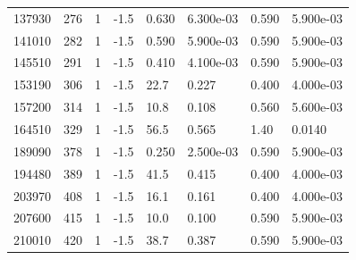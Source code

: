 \documentclass[preview]{standalone}
\begin{document}
{{{{{{{{{\begin{tabular}{L{1.2cm}C{1.2cm} C{0.3cm}C{0.5cm} C{1.4cm}C{1.4cm} C{1.4cm}C{1.4cm}}
  137930  &   276  & 1     & -1.5 &  0.630  & 6.300e-03  & 0.590 &  5.900e-03   \\ 
  141010  &   282  & 1     & -1.5 &  0.590  & 5.900e-03  & 0.590 &  5.900e-03   \\ 
  145510  &   291  & 1     & -1.5 &  0.410  & 4.100e-03  & 0.590 &  5.900e-03   \\ 
  153190  &   306  & 1     & -1.5 &  22.7  & 0.227  & 0.400 &  4.000e-03   \\ 
  157200  &   314  & 1     & -1.5 &  10.8  & 0.108  & 0.560 &  5.600e-03   \\ 
  164510  &   329  & 1     & -1.5 &  56.5  & 0.565  & 1.40 &  0.0140   \\ 
  189090  &   378  & 1     & -1.5 &  0.250  & 2.500e-03  & 0.590 &  5.900e-03   \\ 
  194480  &   389  & 1     & -1.5 &  41.5  & 0.415  & 0.400 &  4.000e-03   \\ 
  203970  &   408  & 1     & -1.5 &  16.1  & 0.161  & 0.400 &  4.000e-03   \\ 
  207600  &   415  & 1     & -1.5 &  10.0  & 0.100  & 0.590 &  5.900e-03   \\ 
  210010  &   420  & 1     & -1.5 &  38.7  & 0.387  & 0.590 &  5.900e-03   \\ 
\hline 
\end{tabular} 

}}}}}}}}}
\end{document}

